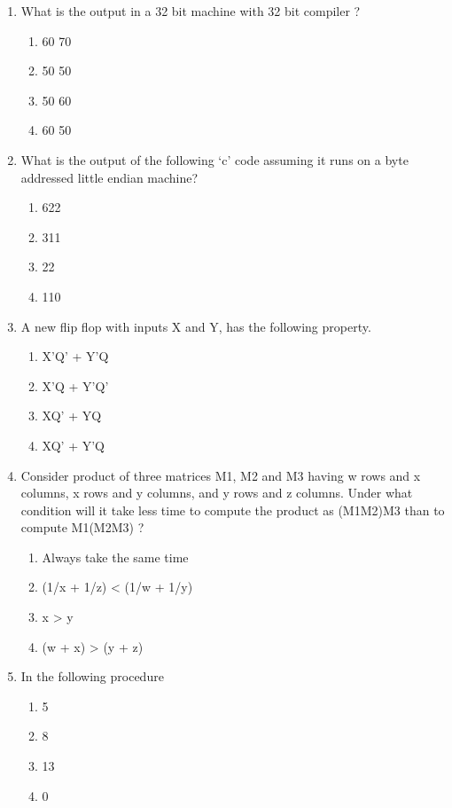 \documentclass[12pt]{article}
\begin{document}
\begin{enumerate}
\item[76.] What is the output in a 32 bit machine with 32 bit compiler ?
\begin{enumerate}[label=\Alph*.]
  \item 60 70
  \item 50 50
  \item 50 60
  \item 60 50
\end{enumerate}

\item[77.] What is the output of the following ‘c’ code assuming it runs on a byte addressed little endian machine?
\begin{enumerate}[label=\Alph*.]
  \item 622
  \item 311
  \item 22
  \item 110
\end{enumerate}

\item[78.] A new flip flop with inputs X and Y, has the following property.
\begin{enumerate}[label=\Alph*.]
  \item X'Q' + Y'Q
  \item X'Q + Y'Q'
  \item XQ' + YQ
  \item XQ' + Y'Q
\end{enumerate}

\item[79.] Consider product of three matrices M1, M2 and M3 having w rows and x columns, x rows and y columns, and y rows and z columns. Under what condition will it take less time to compute the product as (M1M2)M3 than to compute M1(M2M3) ?
\begin{enumerate}[label=\Alph*.]
  \item Always take the same time
  \item (1/x + 1/z) \textless{} (1/w + 1/y)
  \item x \textgreater{} y
  \item (w + x) \textgreater{} (y + z)
\end{enumerate}

\item[80.] In the following procedure
\begin{enumerate}[label=\Alph*.]
  \item 5
  \item 8
  \item 13
  \item 0
\end{enumerate}

\end{enumerate}
\end{document}
